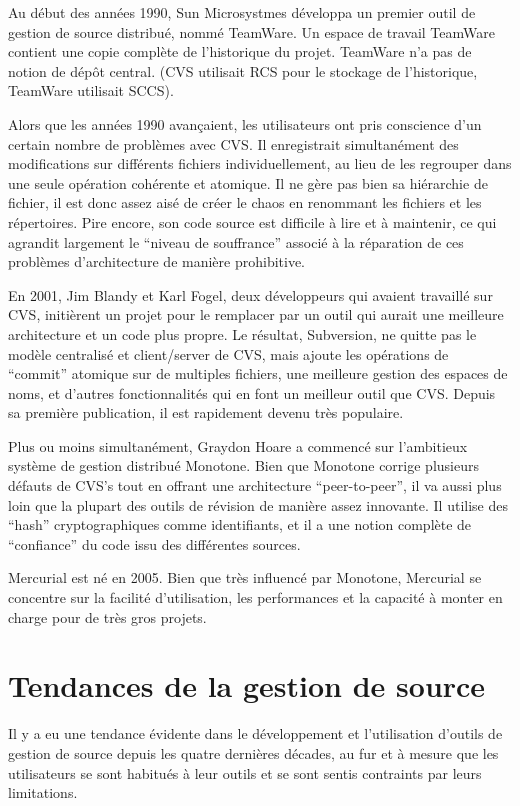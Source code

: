 Au début des années 1990, Sun Microsystmes développa un premier outil de
gestion de source distribué, nommé TeamWare. Un espace de travail TeamWare
contient une copie complète de l'historique du projet. TeamWare n'a pas de
notion de dépôt central. (CVS utilisait RCS pour le stockage de l'historique,
TeamWare utilisait SCCS).

Alors que les années 1990 avançaient, les utilisateurs ont pris conscience d'un
certain nombre de problèmes avec CVS. Il enregistrait simultanément des
modifications sur différents fichiers individuellement, au lieu de les
regrouper dans une seule opération cohérente et atomique. Il ne gère pas bien
sa hiérarchie de fichier, il est donc assez aisé de créer le chaos en renommant
les fichiers et les répertoires. Pire encore, son code source est difficile à
lire et à maintenir, ce qui agrandit largement le ``niveau de souffrance''
associé à la réparation de ces problèmes d'architecture de manière prohibitive. 

En 2001, Jim Blandy et Karl Fogel, deux développeurs qui avaient travaillé sur
CVS, initièrent un projet pour le remplacer par un outil qui aurait une
meilleure architecture et un code plus propre. Le résultat, Subversion, ne
quitte pas le modèle centralisé et client/server de CVS, mais ajoute les
opérations de ``commit'' atomique sur de multiples fichiers, une meilleure
gestion des espaces de noms, et d'autres fonctionnalités qui en font un
meilleur outil que CVS. Depuis sa première publication, il est rapidement
devenu très populaire.

Plus ou moins simultanément, Graydon Hoare a commencé sur l'ambitieux
système de gestion distribué Monotone. Bien que Monotone corrige plusieurs
défauts de CVS's tout en offrant une architecture ``peer-to-peer'', il va aussi
plus loin que la plupart des outils de révision de manière assez innovante. Il
utilise des ``hash'' cryptographiques comme identifiants, et il a une notion
complète de ``confiance'' du code issu des différentes sources.

Mercurial est né en 2005. Bien que très influencé par Monotone, Mercurial se
concentre sur la facilité d'utilisation, les performances et la capacité à
monter en charge pour de très gros projets.

\section{Tendances de la gestion de source}

Il y a eu une tendance évidente dans le développement et l'utilisation d'outils
de gestion de source depuis les quatre dernières décades, au fur et à mesure
que les utilisateurs se sont habitués à leur outils et se sont sentis contraints
par leurs limitations.

